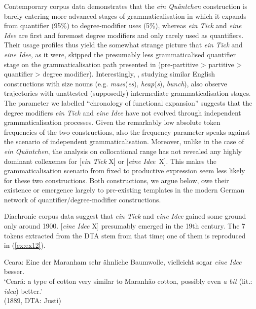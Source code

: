 \documentclass[output=paper]{langsci/langscibook}
\begin{document}
Contemporary corpus data demonstrates that the \textit{ein Quäntchen} construction is barely entering more advanced stages of grammaticalisation in which it expands from quantifier (95\%) to degree\hyp{}modifier uses (5\%), whereas \textit{ein Tick} and \textit{eine Idee} are first and foremost degree modifiers and only rarely used as quantifiers. Their usage profiles thus yield the somewhat strange picture that \textit{ein Tick} and \textit{eine Idee}, as it were, skipped the presumably less grammaticalised quantifier stage on the grammaticalisation path presented in  (pre-partitive > partitive > quantifier > degree modifier). Interestingly, \citet[][]{DeClerckSizenounsmatter2016}, studying similar English constructions with size nouns (e.g. \textit{mass}(\textit{es}), \textit{heap}(\textit{s}), \textit{bunch}), also observe trajectories with unattested (supposedly) intermediate grammaticalisation stages. The parameter we labelled “chronology of functional expansion” suggests that the degree modifiers \textit{ein Tick} and \textit{eine Idee} have not evolved through independent grammaticalisation processes. Given the remarkably low absolute token frequencies of the two constructions, also the frequency parameter speaks against the scenario of independent grammaticalisation. Moreover, unlike in the case of \textit{ein Quäntchen}, the analysis on collocational range has not revealed any highly dominant collexemes for [\textit{ein Tick} X] or [\textit{eine Idee}~X]. This makes the grammaticalisation scenario from fixed to productive expression seem less likely for these two constructions. Both constructions, we argue below, owe their existence or emergence largely to pre-existing templates in the modern German network of quantifier\slash degree\hyp{}modifier constructions. 

Diachronic corpus data suggest that \textit{ein Tick} and \textit{eine Idee} gained some ground only around 1900. [\textit{eine Idee} X] presumably emerged in the 19th century. The 7 tokens extracted from the DTA stem from that time; one of them is reproduced in (\ref{ex:ex12}). 

\begin{exe}
	\ex \label{ex:ex12}  Ceara: Eine der Maranham sehr ähnliche Baumwolle, vielleicht 	sogar \textit{eine Idee} besser. \\
	‘Ceará: a type of cotton very similar to Maranhão cotton, 	possibly even \textit{a bit} (lit.: \textit{idea}) better.' \\ (1889, DTA: Justi) 
\end{exe}
\end{document}
